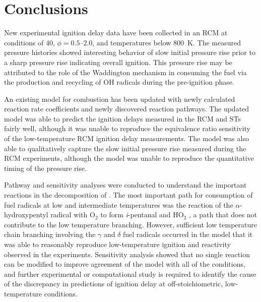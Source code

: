 \documentclass[../main.tex]{subfiles}
\begin{document}

\section{Conclusions}
\label{sec:ipeoh-conclusions}

New experimental ignition delay data have been collected in an RCM at
conditions of \SI{40}{\atmosphere}, $\phi=\numrange{0.5}{2.0}$, and
temperatures below \SI{800}{\kelvin}. The measured pressure histories
showed interesting behavior of slow initial pressure rise prior to a
sharp pressure rise indicating overall ignition. This pressure rise
may be attributed to the role of the Waddington mechanism in consuming
the fuel via the production and recycling of OH radicals during the
pre-ignition phase.

An existing model \cite{Tsujimura2012} for \iPeOH{} combustion has been updated with newly
calculated reaction rate coefficients and newly discovered reaction
pathways. The updated model was able to predict the ignition
delays measured in the RCM and STs fairly well, although
it was unable to reproduce the equivalence ratio sensitivity of
the low-temperature RCM ignition delay measurements. The model was
also able to qualitatively capture the slow initial pressure rise
measured during the RCM experiments, although the model was unable
to reproduce the quantitative timing of the pressure rise.

Pathway and sensitivity analyses were conducted to understand
the important reactions in the decomposition of \iPeOH{}.
The most important path for consumption of fuel radicals at low
and intermediate temperatures was the reaction of the
$\alpha$-hydroxypentyl radical with O$_2$ to form
\textit{i}-pentanal and HO$_2$ , a path that does not contribute to the
low temperature branching. However, sufficient low temperature chain
branching involving the $\gamma$ and $\delta$ fuel radicals occurred
in the model that it was able to reasonably reproduce low-temperature
ignition and reactivity observed in the experiments. Sensitivity
analysis showed that no single reaction can be modified to improve
agreement of the model with all of the conditions, and further
experimental or computational study is required to identify the
cause of the discrepancy in predictions of ignition delay
at off-stoichiometric, low-temperature conditions.
\end{document}
